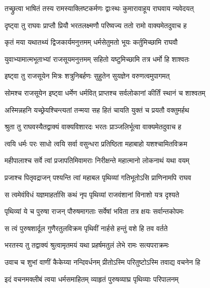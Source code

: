 
\twolineshloka
{तच्छ्रुत्वा भाषितं तस्य रामस्याक्लिष्टकर्मणः}
{द्वाःस्थः कुमारावाहूय राघवाय न्यवेदयत्} %

\twolineshloka
{दृष्ट्वा तु राघवः प्राप्तौ प्रियौ भरतलक्ष्मणौ}
{परिष्वज्य ततो रामो वाक्यमेतदुवाच ह} %

\twolineshloka
{कृतं मया यथातथ्यं द्विजकार्यमनुत्तमम्}
{धर्मसेतुमतो भूयः कर्तुमिच्छामि राघवौ} %

\twolineshloka
{युवाभ्यामात्मभूताभ्यां राजसूयमनुत्तमम्}
{सहितो यष्टुमिच्छामि तत्र धर्मो हि शाश्वतः} %

\twolineshloka
{इष्ट्वा तु राजसूयेन मित्रः शत्रुनिबर्हणः}
{सुहुतेन सुयज्ञेन वरुणत्वमुपागमत्} %

\twolineshloka
{सोमश्च राजसूयेन इष्ट्वा धर्मेण धर्मवित्}
{प्राप्तश्च सर्वलोकानां कीर्तिं स्थानं च शाश्वतम्} %

\twolineshloka
{अस्मिन्नहनि यच्छ्रेयश्चिन्त्यतां तन्मया सह}
{हितं चायति युक्तं च प्रयतौ वक्तुमर्हथ} %

\twolineshloka
{श्रुता तु राघवस्यैतद्वाक्यं वाक्यविशारदः}
{भरतः प्राञ्जलिर्भूत्वा वाक्यमेतदुवाच ह} %

\twolineshloka
{त्वयि धर्मः परः साधो त्वयि सर्वा वसुन्धरा}
{प्रतिष्ठिता महाबाहो यशश्चामितविक्रम} %

\twolineshloka
{महीपालाश्च सर्वे त्वां प्रजापतिमिवामराः}
{निरीक्षन्ते महात्मानो लोकनाथं यथा वयम्} %

\twolineshloka
{प्रजाश्च पितृवद्राजन् पश्यन्ति त्वां महाबल}
{पृथिव्यां गतिभूतोऽसि प्राणिनामपि राघव} %

\twolineshloka
{स त्वमेवंविधं यज्ञमाहर्तासि कथं नृप}
{पृथिव्यां राजवंशानां विनाशो यत्र दृश्यते} %

\twolineshloka
{पृथिव्यां ये च पुरुषा राजन् पौरुषमागताः}
{सर्वेषां भविता तत्र क्षयः सर्वान्तकोपमः} %

\twolineshloka
{स त्वं पुरुषशार्दूल गुणैरतुलविक्रम}
{पृथिवीं नार्हसे हन्तुं वशे हि तव वर्तते} %

\twolineshloka
{भरतस्य तु तद्वाक्यं श्रुत्वामृतमयं यथा}
{प्रहर्षमतुलं लेभे रामः सत्यपराक्रमः} %

\twolineshloka
{उवाच च शुभां वाणीं कैकेय्या नन्दिवर्धनम्}
{प्रीतोऽस्मि परितुष्टोऽस्मि तवाद्य वचनेन हि} %

\twolineshloka
{इदं वचनमक्लीबं त्वया धर्मसमाहितम्}
{व्याहृतं पुरुषव्याघ्र पृथिव्याः परिपालनम्} %

